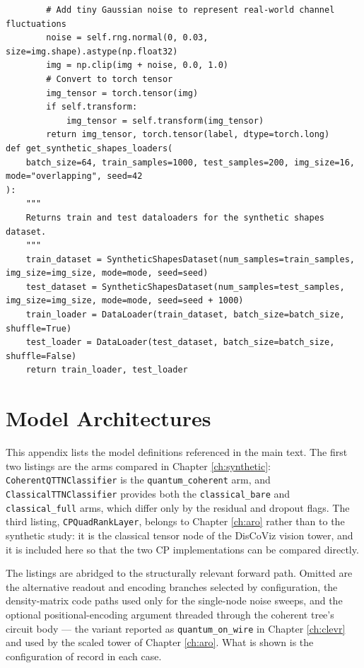\documentclass[12pt, a4paper, oneside]{report}
\begin{document}
\begin{verbatim}
        # Add tiny Gaussian noise to represent real-world channel fluctuations
        noise = self.rng.normal(0, 0.03, size=img.shape).astype(np.float32)
        img = np.clip(img + noise, 0.0, 1.0)
        # Convert to torch tensor
        img_tensor = torch.tensor(img)
        if self.transform:
            img_tensor = self.transform(img_tensor)
        return img_tensor, torch.tensor(label, dtype=torch.long)
def get_synthetic_shapes_loaders(
    batch_size=64, train_samples=1000, test_samples=200, img_size=16, mode="overlapping", seed=42
):
    """
    Returns train and test dataloaders for the synthetic shapes dataset.
    """
    train_dataset = SyntheticShapesDataset(num_samples=train_samples, img_size=img_size, mode=mode, seed=seed)
    test_dataset = SyntheticShapesDataset(num_samples=test_samples, img_size=img_size, mode=mode, seed=seed + 1000)
    train_loader = DataLoader(train_dataset, batch_size=batch_size, shuffle=True)
    test_loader = DataLoader(test_dataset, batch_size=batch_size, shuffle=False)
    return train_loader, test_loader
\end{verbatim}

\chapter{Model Architectures}
\label{appendix:models}

This appendix lists the model definitions referenced in the main text. The first two listings are the arms compared in Chapter \ref{ch:synthetic}: \texttt{CoherentQTTNClassifier} is the \texttt{quantum\_coherent} arm, and \texttt{ClassicalTTNClassifier} provides both the \texttt{classical\_bare} and \texttt{classical\_full} arms, which differ only by the residual and dropout flags. The third listing, \texttt{CPQuadRankLayer}, belongs to Chapter \ref{ch:aro} rather than to the synthetic study: it is the classical tensor node of the DisCoViz vision tower, and it is included here so that the two CP implementations can be compared directly.

The listings are abridged to the structurally relevant forward path. Omitted are the alternative readout and encoding branches selected by configuration, the density-matrix code paths used only for the single-node noise sweeps, and the optional positional-encoding argument threaded through the coherent tree's circuit body --- the variant reported as \texttt{quantum\_on\_wire} in Chapter \ref{ch:clevr} and used by the scaled tower of Chapter \ref{ch:aro}. What is shown is the configuration of record in each case.
\end{document}
